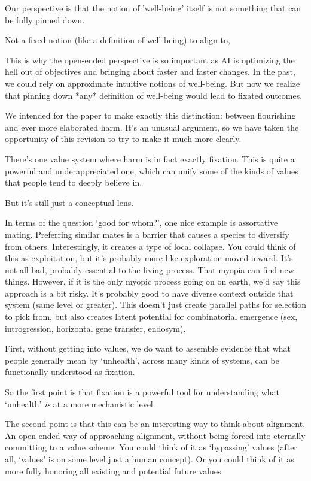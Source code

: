 \documentclass[fontsize=11.5pt]{scrartcl}
\newcounter{point}
\begin{document}
Our perspective is that the notion of 'well-being' itself is not something that can be fully pinned down.

Not a fixed notion (like a definition of well-being) to align to,

This is why the open-ended perspective is so important as AI is optimizing the hell out of objectives and bringing about faster and faster changes. In the past, we could rely on approximate intuitive notions of well-being. But now we realize that pinning down *any* definition of well-being would lead to fixated outcomes.

We intended for the paper to make exactly this distinction: between flourishing and ever more elaborated harm. It's an unusual argument, so we have taken the opportunity of this revision to try to make it much more clearly.

There's one value system where harm is in fact exactly fixation. This is quite a powerful and underappreciated one, which can unify some of the kinds of values that people tend to deeply believe in.

But it's still just a conceptual lens.


In terms of the question `good for whom?', one nice example is assortative mating. Preferring similar mates is a barrier that causes a species to diversify from others. Interestingly, it creates a type of local collapse. You could think of this as exploitation, but it's probably more like exploration moved inward.  It's not all bad, probably essential to the living process.  That myopia can find new things.  However, if it is the only myopic process going on on earth, we'd say this approach is a bit risky.  It's probably good to have diverse context outside that system (same level or greater).  This doesn't just create parallel paths for selection to pick from, but also creates latent potential for combinatorial emergence (sex, introgression, horizontal gene transfer, endosym).


First, without getting into values, we do want to assemble evidence that what people generally mean by `unhealth', across many kinds of systems, can be functionally understood as fixation.

So the first point is that fixation is a powerful tool for understanding what `unhealth' \textit{is} at a more mechanistic level.

The second point is that this can be an interesting way to think about alignment. An open-ended way of approaching alignment, without being forced into eternally committing to a value scheme. You could think of it as `bypassing' values (after all, `values' is on some level just a human concept). Or you could think of it as more fully honoring all existing and potential future values.
\end{document}

